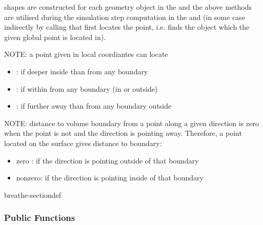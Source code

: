 \documentclass[letterpaper,10pt,english]{sphinxmanual}
\begin{document}
\begin{fulllineitems}
\sphinxAtStartPar
{\hyperref[\detokenize{Simulation/SimulationCodeDoc:class_box}]{}} shapes are constructed for each geometry object in the  and the above methods are utilised during the simulation step computation in the  and  (in some case indirectly by calling  that first locates the point, i.e. finds the {\hyperref[\detokenize{Simulation/SimulationCodeDoc:class_box}]{}} object which the given global point is located in).

\sphinxAtStartPar
NOTE: a point given in local coordiantes can locate\begin{itemize}
\item {} 
\sphinxAtStartPar
{} : if deeper inside than  from any boundary

\item {} 
\sphinxAtStartPar
{} : if within  from any boundary (in\sphinxhyphen{} or outside)

\item {} 
\sphinxAtStartPar
{} : if further away than  from any boundary outside

\end{itemize}


\sphinxAtStartPar
NOTE: distance to volume boundary from a point along a given direction is zero when the point is not  and the direction is pointing away. Therefore, a point located on the surface gives distance to boundary:\begin{itemize}
\item {} 
\sphinxAtStartPar
zero : if the direction is pointing outside of that boundary

\item {} 
\sphinxAtStartPar
non\sphinxhyphen{}zero: if the direction is pointing inside of that boundary 

\end{itemize}


\begin{sphinxuseclass}{breathe-sectiondef}\subsubsection*{Public Functions}


\end{sphinxuseclass}
\end{fulllineitems}
\end{document}
